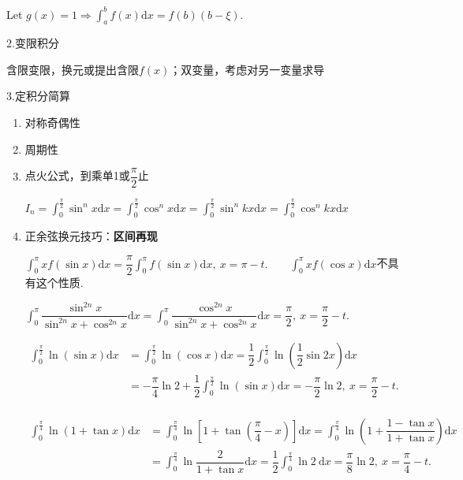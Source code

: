 \documentclass[UTF8]{ctexart}
\newcommand\dif{\mathrm{d}}
\newcommand\no{\noindent}
\newcommand\dis{\displaystyle}
\newcommand\intd{\dis\int}
\newcommand\intab{\dis\int_a^b}
\begin{document}
\begin{spacing}{2}
\begin{enumerate}[itemindent=1.4em, label=(\arabic*)]
\begin{enumerate}[itemindent=1.4em, label=(\alph*)]
Let $g(x)=1\Longrightarrow\intab f(x)\dif x=f(b)(b-\xi).$

\end{enumerate}

\end{enumerate}

\no2.变限积分

含限变限，换元或提出含限$f(x)$；双变量，考虑对另一变量求导

\no3.定积分简算

\begin{enumerate}[itemindent=1.4em, label=(\arabic*)]

\item 对称奇偶性

\item 周期性

\item \textcolor[rgb]{1,0,0}{点火公式}，到乘单1或$\dfrac{\pi}{2}$止

$I_n=\intd_0^{\tfrac{\pi}{2}}\sin^nx\dif x
=\intd_0^{\tfrac{\pi}{2}}\cos^nx\dif x
=\intd_0^{\tfrac{\pi}{2}}\sin^nkx\dif x
=\intd_0^{\tfrac{\pi}{2}}\cos^nkx\dif x$

\item 正余弦换元技巧：\textbf{区间再现}

$\intd_0^{\pi}xf(\sin x)\dif x=\dfrac{\pi}{2}\intd_0^\pi f(\sin x)\dif x,\ x=\pi-t.
\qquad\intd_0^{\pi}xf(\cos x)\dif x$不具有这个性质.

\vspace{0.3cm}

$\intd_0^\pi \dfrac{\sin^{2n}x}{\sin^{2n}x+\cos^{2n}x}\dif x=
\intd_0^\pi \dfrac{\cos^{2n}x}{\sin^{2n}x+\cos^{2n}x}\dif x=\dfrac{\pi}{2},\ 
x=\dfrac{\pi}{2}-t.$

\vspace{0.3cm}

$\begin{aligned}
\intd_0^{\tfrac{\pi}{2}}\ln (\sin x)\dif x&=\intd_0^{\tfrac{\pi}{2}}\ln (\cos x)\dif x=
\dfrac{1}{2}\intd_0^{\tfrac{\pi}{2}}\ln \left(\dfrac{1}{2}\sin 2x\right)\dif x\\
&=-\dfrac{\pi}{4}\ln 2+\dfrac{1}{2}\intd_0^{\tfrac{\pi}{2}}\ln (\sin x)\dif x=
-\dfrac{\pi}{2}\ln 2,\ x=\dfrac{\pi}{2}-t.\\
\end{aligned}$

$\begin{aligned}
\intd_0^{\tfrac{\pi}{4}}\ln(1+\tan x)\dif x
&=\intd_0^{\tfrac{\pi}{4}}\ln\left[1+\tan \left(\dfrac{\pi}{4}-x\right)\right]\dif x
=\intd_0^{\tfrac{\pi}{4}}\ln\left(1+\dfrac{1-\tan x}{1+\tan x}\right)\dif x\\
&=\intd_0^{\tfrac{\pi}{4}}\ln\dfrac{2}{1+\tan x}\dif x
=\dfrac{1}{2}\intd_0^{\tfrac{\pi}{4}}\ln2\ \dif x=\dfrac{\pi}{8}\ln2,\ x=\dfrac{\pi}{4}-t.\\
\end{aligned}$


\end{enumerate}
\end{spacing}
\end{document}
